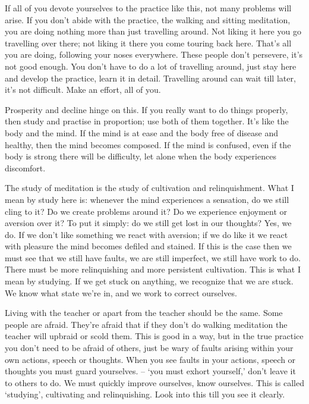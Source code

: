 If all of you devote yourselves to the practice like this, not many problems will arise. If you don't abide with the practice, the walking and sitting meditation, you are doing nothing more than just travelling around. Not liking it here you go travelling over there; not liking it there you come touring back here. That's all you are doing, following your noses everywhere. These people don't persevere, it's not good enough. You don't have to do a lot of travelling around, just stay here and develop the practice, learn it in detail. Travelling around can wait till later, it's not difficult. Make an effort, all of you. 

Prosperity and decline hinge on this. If you really want to do things properly, then study and practise in proportion; use both of them together. It's like the body and the mind. If the mind is at ease and the body free of disease and healthy, then the mind becomes composed. If the mind is confused, even if the body is strong there will be difficulty, let alone when the body experiences discomfort. 

The study of meditation is the study of cultivation and relinquishment. What I mean by study here is: whenever the mind experiences a sensation, do we still cling to it? Do we create problems around it? Do we experience enjoyment or aversion over it? To put it simply: do we still get lost in our thoughts? Yes, we do. If we don't like something we react with aversion; if we do like it we react with pleasure the mind becomes defiled and stained. If this is the case then we must see that we still have faults, we are still imperfect, we still have work to do. There must be more relinquishing and more persistent cultivation. This is what I mean by studying. If we get stuck on anything, we recognize that we are stuck. We know what state we're in, and we work to correct ourselves. 

Living with the teacher or apart from the teacher should be the same. Some people are afraid. They're afraid that if they don't do walking meditation the teacher will upbraid or scold them. This is good in a way, but in the true practice you don't need to be afraid of others, just be wary of faults arising within your own actions, speech or thoughts. When you see faults in your actions, speech or thoughts you must guard yourselves.  -- `you must exhort yourself,' don't leave it to others to do. We must quickly improve ourselves, know ourselves. This is called `studying', cultivating and relinquishing. Look into this till you see it clearly. 

